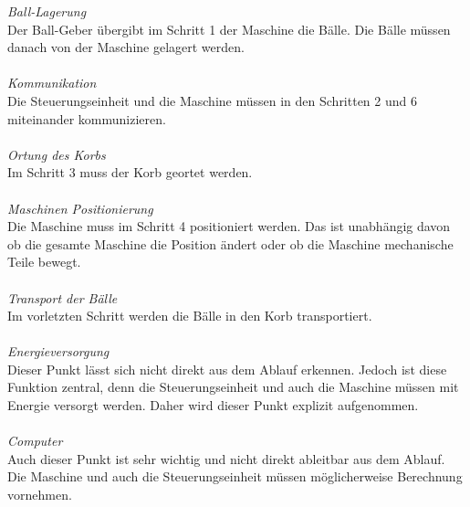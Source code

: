 \emph{Ball-Lagerung}\\
Der Ball-Geber übergibt im Schritt 1 der Maschine die Bälle. Die Bälle müssen danach von der Maschine gelagert werden.\\
\\
\emph{Kommunikation}\\
Die Steuerungseinheit und die Maschine müssen in den Schritten 2 und 6 miteinander kommunizieren.\\
\\
\emph{Ortung des Korbs}\\
Im Schritt 3 muss der Korb geortet werden.\\
\\
\emph{Maschinen Positionierung}\\
Die Maschine muss im Schritt 4 positioniert werden. Das ist unabhängig davon ob die gesamte Maschine die Position ändert oder ob die Maschine mechanische Teile bewegt.\\
\\
\emph{Transport der Bälle}\\
Im vorletzten Schritt werden die Bälle in den Korb transportiert.\\
\\
\emph{Energieversorgung}\\
Dieser Punkt lässt sich nicht direkt aus dem Ablauf erkennen. Jedoch ist diese Funktion zentral, denn die Steuerungseinheit und auch die Maschine müssen mit Energie versorgt werden. Daher wird dieser Punkt explizit aufgenommen.\\
\\\emph{Computer}\\
Auch dieser Punkt ist sehr wichtig und nicht direkt ableitbar aus dem Ablauf. Die Maschine und auch die Steuerungseinheit müssen möglicherweise Berechnung vornehmen.